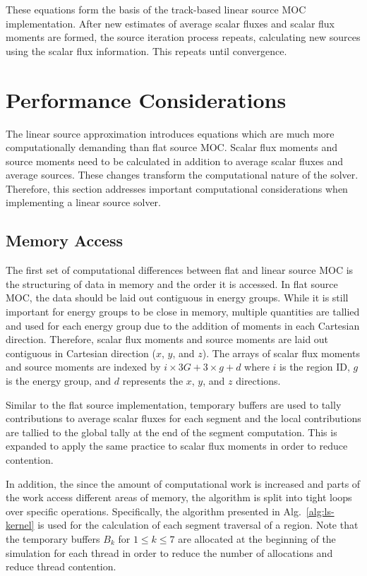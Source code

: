 These equations form the basis of the track-based linear source \ac{MOC} implementation. After new estimates of average scalar fluxes and scalar flux moments are formed, the source iteration process repeats, calculating new sources using the scalar flux information. This repeats until convergence.

\section{Performance Considerations}
\label{sec:ls-performance}

The linear source approximation introduces equations which are much more computationally demanding than flat source \ac{MOC}. Scalar flux moments and source moments need to be calculated in addition to average scalar fluxes and average sources. These changes transform the computational nature of the solver. Therefore, this section addresses important computational considerations when implementing a linear source solver.

\subsection{Memory Access}

The first set of computational differences between flat and linear source \ac{MOC} is the structuring of data in memory and the order it is accessed. In flat source \ac{MOC}, the data should be laid out contiguous in energy groups. While it is still important for energy groups to be close in memory, multiple quantities are tallied and used for each energy group due to the addition of moments in each Cartesian direction. Therefore, scalar flux moments and source moments are laid out contiguous in Cartesian direction ($x$, $y$, and $z$). The arrays of scalar flux moments and source moments are indexed by $i\times 3G + 3\times g + d$ where $i$ is the region ID, $g$ is the energy group, and $d$ represents the $x$, $y$, and $z$ directions.

Similar to the flat source implementation, temporary buffers are used to tally contributions to average scalar fluxes for each segment and the local contributions are tallied to the global tally at the end of the segment computation. This is expanded to apply the same practice to scalar flux moments in order to reduce contention.

In addition, the since the amount of computational work is increased and parts of the work access different areas of memory, the algorithm is split into tight loops over specific operations. Specifically, the algorithm presented in Alg.~\ref{alg:ls-kernel} is used for the calculation of each segment traversal of a region. Note that the temporary buffers $B_k$ for $1 \leq k \leq 7$ are allocated at the beginning of the simulation for each thread in order to reduce the number of allocations and reduce thread contention.

